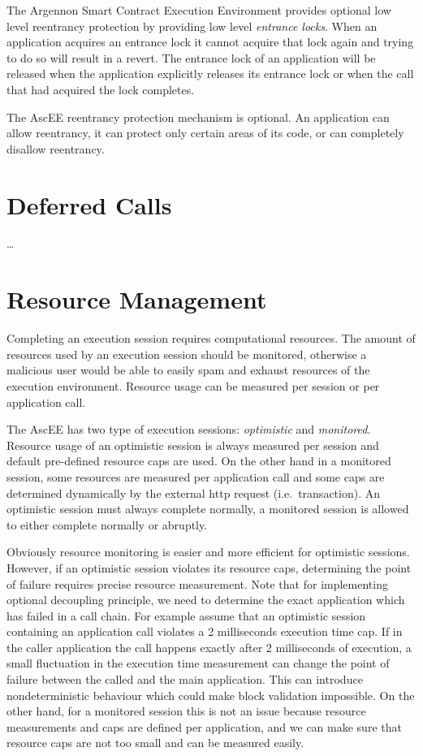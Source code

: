 The Argennon Smart Contract Execution Environment provides optional low level reentrancy protection by providing low
level \emph{entrance locks}. When an application acquires an entrance lock it cannot acquire that lock again and trying
to do so will result in a revert. The entrance lock of an application will be released when the application explicitly
releases its entrance lock or when the call that had acquired the lock completes.

The AscEE reentrancy protection mechanism is optional. An application can allow reentrancy, it can protect only certain
areas of its code, or can completely disallow reentrancy.


\section{Deferred Calls}\label{sec:deferred-calls}

\ldots


\section{Resource Management}\label{sec:res-man}

Completing an execution session requires computational resources. The amount of resources used by an execution session
should be monitored, otherwise a malicious user would be able to easily spam and exhaust resources of the execution
environment. Resource usage can be measured per session or per application call.

The AscEE has two type of execution sessions: \emph{optimistic} and \emph{monitored}. Resource usage of an optimistic
session is always measured per session and default pre-defined resource caps are used. On the other hand in a monitored
session, some resources are measured per application call and some
caps are determined dynamically by the external http request (i.e.\ transaction). An optimistic session must always
complete normally, a monitored session is allowed to either complete normally or abruptly.

Obviously resource monitoring is easier and more efficient for optimistic sessions. However, if
an optimistic session violates its resource caps, determining the point of failure requires precise resource
measurement. Note that for implementing optional decoupling principle, we need to determine the exact application
which has failed in a call chain. For example assume that an optimistic session containing an application call
violates a 2 milliseconds execution time cap. If in the caller application the call happens exactly after 2
milliseconds of execution, a small fluctuation in the execution time measurement can
change the point of failure between the called and the main application. This can introduce nondeterministic
behaviour which could make block validation impossible. On the other hand, for a monitored session this is not an issue
because resource measurements and caps are defined per application, and we can make sure that resource caps are not too
small and can be measured easily.


